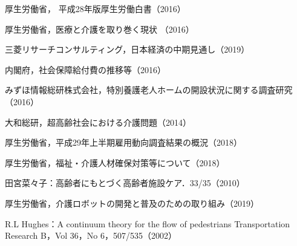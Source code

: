 \begin{thebibliography}{99}
  厚生労働省， 平成28年版厚生労働白書（2016）

  厚生労働省，医療と介護を取り巻く現状 （2016）

  三菱リサーチコンサルティング，日本経済の中期見通し（2019）

  内閣府，社会保障給付費の推移等（2016）

  みずほ情報総研株式会社，特別養護老人ホームの開設状況に関する調査研究（2016）

  大和総研，超高齢社会における介護問題（2014）

  厚生労働省，平成29年上半期雇用動向調査結果の概況（2018）

  厚生労働省，福祉・介護人材確保対策等について（2018）

  田宮菜々子：高齢者にもとづく高齢者施設ケア．33/35（2010）


  厚生労働省，介護ロボットの開発と普及のための取り組み（2019）

  R.L Hughes：A continuum theory for the flow of pedestrians Transportation Research B，Vol 36，No 6，507/535（2002）


\end{thebibliography}
